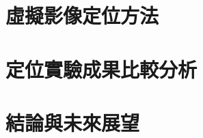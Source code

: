 \documentclass[12pt, a4paper]{ntust_report}
\begin{document}
\chapter{虛擬影像定位方法}
\label{Sec:Methodology}


\chapter{定位實驗成果比較分析}
\label{Sec:Experiment}


\chapter{結論與未來展望}
\label{Sec:FutureWork}



\end{document}
